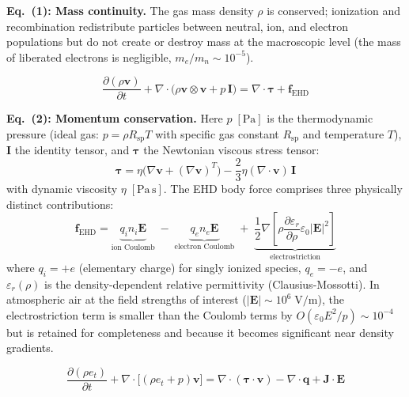 \documentclass[12pt,twocolumn]{article}
\newcommand{\ee}{\mathbf{E}}
\newcommand{\jj}{\mathbf{J}}
\newcommand{\vv}{\mathbf{v}}
\newcommand{\ff}{\mathbf{f}}
\renewcommand{\qq}{\mathbf{q}}
\begin{document}
\noindent
\textbf{Eq.~(1): Mass continuity.} The gas mass density $\rho$ is
conserved; ionization and recombination redistribute particles between
neutral, ion, and electron populations but do not create or destroy
mass at the macroscopic level (the mass of liberated electrons is
negligible, $m_e/m_n \sim 10^{-5}$).

\begin{equation}
\boxed{
  \frac{\partial (\rho \vv)}{\partial t}
  + \nabla \cdot \bigl(\rho \vv \otimes \vv + p\,\mathbf{I}\bigr)
  = \nabla \cdot \bm{\tau} + \ff_{\mathrm{EHD}}
}
\tag{2}
\label{eq:NS2}
\end{equation}

\noindent
\textbf{Eq.~(2): Momentum conservation.} Here $p\;[\mathrm{Pa}]$ is
the thermodynamic pressure (ideal gas: $p = \rho R_{\mathrm{sp}} T$
with specific gas constant $R_{\mathrm{sp}}$ and temperature $T$),
$\mathbf{I}$ the identity tensor, and $\bm{\tau}$ the Newtonian
viscous stress tensor:
\begin{equation}
  \bm{\tau} = \eta\bigl(\nabla\vv + (\nabla\vv)^T\bigr)
  - \frac{2}{3}\eta(\nabla \cdot \vv)\,\mathbf{I}
  \label{eq:viscous_stress}
\end{equation}
with dynamic viscosity $\eta\;[\mathrm{Pa\,s}]$. The EHD body force
comprises three physically distinct contributions:
\begin{equation}
  \ff_{\mathrm{EHD}}
  = \underbrace{q_i n_i \ee}_{\text{ion Coulomb}}
  \;-\; \underbrace{q_e n_e \ee}_{\text{electron Coulomb}}
  \;+\; \underbrace{\frac{1}{2}\nabla\!\left[
    \rho\frac{\partial\varepsilon_r}{\partial\rho}
    \varepsilon_0 |\ee|^2
  \right]}_{\text{electrostriction}}
  \label{eq:f_EHD}
\end{equation}
where $q_i = +e$ (elementary charge) for singly ionized species,
$q_e = -e$, and $\varepsilon_r(\rho)$ is the density-dependent
relative permittivity (Clausius-Mossotti). In atmospheric air at
the field strengths of interest ($|\ee| \sim 10^6\;\mathrm{V/m}$),
the electrostriction term is smaller than the Coulomb terms by
$O(\varepsilon_0 E^2 / p) \sim 10^{-4}$ but is retained for
completeness and because it becomes significant near density gradients.

\begin{equation}
\boxed{
  \frac{\partial (\rho e_t)}{\partial t}
  + \nabla \cdot \bigl[(\rho e_t + p)\vv\bigr]
  = \nabla \cdot (\bm{\tau} \cdot \vv)
  - \nabla \cdot \qq + \jj \cdot \ee
}
\tag{3}
\label{eq:NS3}
\end{equation}
\end{document}
